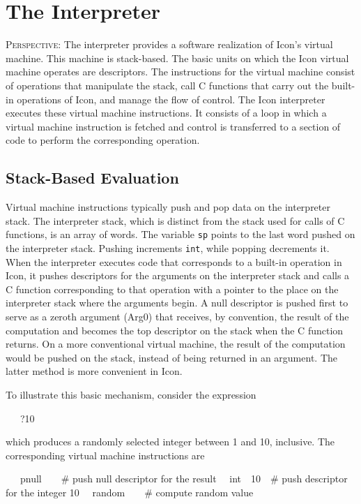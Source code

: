 \chapter{The Interpreter}

\textsc{Perspective}: The interpreter provides a software realization
of Icon's virtual machine. This machine is stack-based. The basic
units on which the Icon virtual machine operates are descriptors. The
instructions for the virtual machine consist of operations that
manipulate the stack, call C functions that carry out the built-in
operations of Icon, and manage the flow of control. The Icon
interpreter executes these virtual machine instructions.  It consists
of a loop in which a virtual machine instruction is fetched and
control is transferred to a section of code to perform the
corresponding operation.

\section{Stack-Based Evaluation}

Virtual machine instructions typically push and pop data on the
interpreter stack. The interpreter stack, which is distinct from the
stack used for calls of C functions, is an array of words. The
variable \texttt{sp} points to the last word pushed on the interpreter
stack. Pushing increments \texttt{int}, while popping decrements
it. When the interpreter executes code that corresponds to a built-in
operation in Icon, it pushes descriptors for the arguments on the
interpreter stack and calls a C function corresponding to that
operation with a pointer to the place on the interpreter stack where
the arguments begin. A null descriptor is pushed first to serve as a
{\textquotedbl}zeroth{\textquotedbl} argument (Arg0) that receives, by
convention, the result of the computation and becomes the top
descriptor on the stack when the C function returns. On a more
conventional virtual machine, the result of the computation would be
pushed on the stack, instead of being returned in an argument. The
latter method is more convenient in Icon.

To illustrate this basic mechanism, consider the expression

{\ttfamily\mdseries
\ \ \ ?10}

\noindent which produces a randomly selected integer between 1 and 10,
inclusive. The corresponding virtual machine instructions are

{\ttfamily\mdseries
\ \ \ pnull\ \ \ \ \# push null descriptor for the result\newline
 \ \ int\ \ 10\ \ \# push descriptor for the integer 10\newline
 \ \ random\ \ \ \ \# compute random value}

